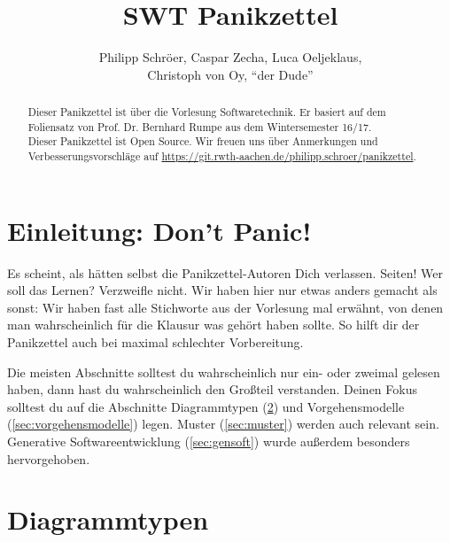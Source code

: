 \documentclass[german]{panikzettel}
\title{SWT Panikzettel}
\author{Philipp Schröer, Caspar Zecha, Luca Oeljeklaus,\\Christoph von Oy, ``der Dude''}
\begin{document}
\maketitle

\begin{abstract}%
  Dieser Panikzettel ist über die Vorlesung Softwaretechnik. Er basiert auf dem Foliensatz von Prof. Dr. Bernhard Rumpe aus dem Wintersemester 16/17.	\\
  Dieser Panikzettel ist Open Source. Wir freuen uns über Anmerkungen und Verbesserungsvorschläge auf \url{https://git.rwth-aachen.de/philipp.schroer/panikzettel}.
\end{abstract}

\tableofcontents

\newpage

\section{Einleitung: Don't Panic!}

Es scheint, als hätten selbst die Panikzettel-Autoren Dich verlassen.
\pageref{LastPage} Seiten!
Wer soll das Lernen?
Verzweifle nicht.
Wir haben hier nur etwas anders gemacht als sonst: Wir haben fast alle Stichworte aus der Vorlesung mal erwähnt, von denen man wahrscheinlich für die Klausur was gehört haben sollte.
So hilft dir der Panikzettel auch bei maximal schlechter Vorbereitung.

Die meisten Abschnitte solltest du wahrscheinlich nur ein- oder zweimal gelesen haben, dann hast du wahrscheinlich den Großteil verstanden.
Deinen Fokus solltest du auf die Abschnitte Diagrammtypen (\ref{sec:diagrammtypen}) und Vorgehensmodelle (\ref{sec:vorgehensmodelle}) legen.
Muster (\ref{sec:muster}) werden auch relevant sein.
Generative Softwareentwicklung (\ref{sec:gensoft}) wurde außerdem besonders hervorgehoben.

\section{Diagrammtypen}
\label{sec:diagrammtypen}
\end{document}
